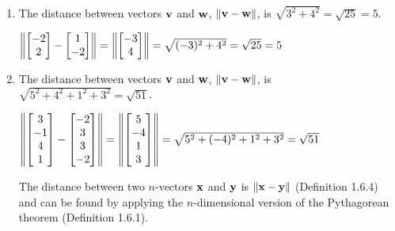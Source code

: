 \begin{solution}
\begin{enumerate}
  \item 
  	\begin{answer}
		The distance between vectors $\mathbf{v}$ and $\mathbf{w}$, $\left\lVert \mathbf{v} - \mathbf{w} \right\rVert$, is $\sqrt{3^2 + 4^2} = \sqrt{25} = 5$.
	\end{answer}
	$\left\lVert \begin{bmatrix}-2\\2\end{bmatrix} - \begin{bmatrix}1\\-2\end{bmatrix} \right\rVert = \left\lVert \begin{bmatrix}-3\\4\end{bmatrix} \right\rVert
	= \sqrt{(-3)^2 + 4^2} = \sqrt{25} = 5$

	
  \item 
  	\begin{answer}
		The distance between vectors $\mathbf{v}$ and $\mathbf{w}$, $\left\lVert \mathbf{v} - \mathbf{w} \right\rVert$, is $\sqrt{5^2 + 4^2 + 1^2 + 3^2} = \sqrt{51}$.
	\end{answer}
	
		$\left\lVert \begin{bmatrix}3\\-1\\4\\1\end{bmatrix} - \begin{bmatrix}-2\\3\\3\\-2\end{bmatrix} \right\rVert = 
		\left\lVert \begin{bmatrix}5\\-4\\1\\3\end{bmatrix} \right\rVert
		=\sqrt{5^2 + (-4)^2 + 1^2 + 3^2} = \sqrt{51}$
		
		The distance between two $n$-vectors $\mathbf{x}$ and $\mathbf{y}$ is $\left\lVert \mathbf{x} - \mathbf{y} \right\rVert$ (Definition 1.6.4) and can be found by applying the $n$-dimensional version of the Pythagorean theorem (Definition 1.6.1).
\end{enumerate}
\end{solution}

